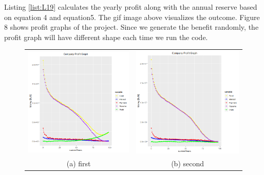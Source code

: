 \documentclass[12pt]{article}
\begin{document}

Listing \ref{list:L19} calculates the yearly profit along with the annual reserve based on equation 4 and equation5. The gif image above visualizes the outcome. Figure 8 shows profit graphs of the project. Since we generate the benefit randomly, the profit graph will have different shape each time we run the code.
\newpage
\begin{figure}[h]
	\begin{tabular}{cc}
		\includegraphics[width=65mm]{report_profit.PNG} &   \includegraphics[width=65mm]{profit1.PNG} \\
		(a) first & (b) second \\[6pt]

\end{tabular}
\end{figure}
\end{document}
